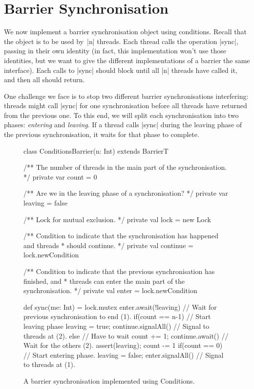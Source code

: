 \section{Barrier Synchronisation}

We now implement a barrier synchronisation object using conditions.  Recall
that the object is to be used by~|n| threads.  Each thread calls the operation
|sync|, passing in their own identity (in fact, this implementation won't use
those identities, but we want to give the different implementations of a
barrier the same interface).  Each calls to |sync| should block until all |n|
threads have called it, and then all should return.  

One challenge we face is to stop two different barrier synchronisations
interfering: threads might call |sync| for one synchronisation before all
threads have returned from the previous one.  To this end, we will split each
synchronisation into two phases: \emph{entering} and \emph{leaving}.  If a
thread calls |sync| during the leaving phase of the previous synchronisation,
it waits for that phase to complete.


\begin{figure}
\begin{scala}
class ConditionsBarrier(n: Int) extends BarrierT{
  /** The number of threads in the main part of the synchronisation. */
  private var count = 0

  /** Are we in the leaving phase of a synchronisation? */
  private var leaving = false

  /** Lock for mutual exclusion. */
  private val lock = new Lock

  /** Condition to indicate that the synchronisation has happened and threads
    * should continue. */
  private val continue = lock.newCondition

  /** Condition to indicate that the previous synchronisation has finished, and
    * threads can enter the main part of the synchronisation. */
  private val enter = lock.newCondition

  def sync(me: Int) = lock.mutex{
    enter.await(!leaving) // Wait for previous synchronisation to end (1).
    if(count == n-1){      // Start leaving phase
      leaving = true; continue.signalAll() // Signal to threads at (2).
    }
    else{      // Have to wait
      count += 1; continue.await() // Wait for the others (2).
      assert(leaving); count -= 1
    }
    if(count == 0){      // Start entering phase.
      leaving = false; enter.signalAll() // Signal to threads at (1).
    }
  }
}
\end{scala}
\caption{A barrier synchronisation implemented using {\scalastyle
    Conditions}.}
\label{fig:ConditionsBarrier}
\end{figure}

